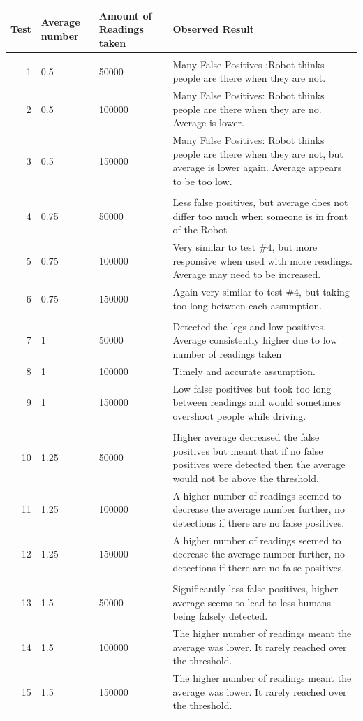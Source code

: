 \documentclass{article}
\begin{document}
	\begin{supertabular}{r | p{2cm} | p{2.5cm} | p{8cm} }
	Test & Average number & Amount of Readings taken & Observed Result \\
	\hline
	  &  &  \\[2ex]
	1 & 0.5 & 50000 & Many False Positives :Robot thinks people are there when they are not. \\[1ex]
	2 & 0.5 & 100000 & Many False Positives: Robot thinks people are there when they are no. Average is lower. \\ [1ex]
3 & 0.5 & 150000 & Many False Positives: Robot thinks people are there when they are not, but average is lower again. Average appears to be too low. \\ [0ex]

	  &  &  \\[2ex]
4 & 0.75 & 50000 & Less false positives, but average does not differ too much when someone is in front of the Robot \\[1ex] 
5 & 0.75 & 100000 & Very similar to test \#4, but more responsive when used with more readings. Average may need to be increased. \\ [0ex]
6 & 0.75 & 150000 & Again very similar to test \#4, but taking too long between each assumption. \\ [1ex]

	  &  &  \\[2ex]
7 & 1 & 50000 & Detected the legs and low positives. Average consistently higher due to low number of readings taken \\ [1ex]
8 & 1 & 100000 & Timely and  accurate assumption. \\ [2ex]
9 & 1 & 150000 & Low false positives but took too long between readings and would sometimes overshoot people while driving. \\ [1ex]

	  &  &  \\[2ex]
10 & 1.25 & 50000 & Higher average decreased the false positives but meant that if no false positives were detected then the average would not be above the threshold. \\ [0ex]
11 & 1.25 & 100000 & A higher number of readings seemed to decrease the average number further, no detections if there are no false positives. \\ [0ex]
12 & 1.25 & 150000 & A higher number of readings seemed to decrease the average number further, no detections if there are no false positives.  \\[0ex] 

	  &  &  \\[2ex]
13 & 1.5 & 50000 & Significantly less false positives, higher average seems to lead to less humans being falsely detected. \\ [1ex]
14 & 1.5 & 100000 & The higher number of readings meant the average was lower. It rarely reached over the threshold. \\ [1ex]
15 & 1.5 & 150000 & The higher number of readings meant the average was lower. It rarely reached over the threshold. \\[1ex]
	
	\end{supertabular}
	
\end{document}
